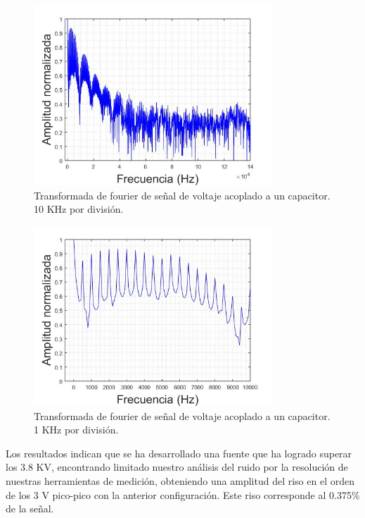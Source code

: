 \begin{figure}[H]
\centering
\includegraphics[width=9cm]{Capitulo3/figs/reso2.jpg}
\caption{Transformada de fourier de señal de voltaje acoplado a un capacitor. 10 KHz por división.}
\end{figure}

\begin{figure}[H]
\centering
\includegraphics[width=9cm]{Capitulo3/figs/KHZ.jpg}
\caption{Transformada de fourier de señal de voltaje acoplado a un capacitor. 1 KHz por división.}
\end{figure}


Los resultados indican que se ha desarrollado una fuente que ha logrado superar los 3.8 KV, encontrando limitado nuestro análisis del ruido por la resolución de nuestras herramientas de medición, obteniendo una amplitud del riso en el orden de los 3 V pico-pico con la anterior configuración. Este riso corresponde al  0.375$\%$ de la señal. \\
